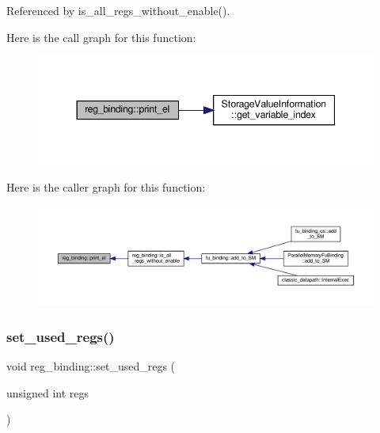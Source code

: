 Referenced by is\+\_\+all\+\_\+regs\+\_\+without\+\_\+enable().

Here is the call graph for this function\+:
\nopagebreak
\begin{figure}[H]
\begin{center}
\leavevmode
\includegraphics[width=344pt]{da/d7c/classreg__binding_abcd4e3cda44712d54c47301cc5fedfb0_cgraph}
\end{center}
\end{figure}
Here is the caller graph for this function\+:
\nopagebreak
\begin{figure}[H]
\begin{center}
\leavevmode
\includegraphics[width=350pt]{da/d7c/classreg__binding_abcd4e3cda44712d54c47301cc5fedfb0_icgraph}
\end{center}
\end{figure}
\mbox{\label{classreg__binding_a9148072d5c10c39562d8e63e17cf2ccb}} 
\subsubsection{\texorpdfstring{set\+\_\+used\+\_\+regs()}{set\_used\_regs()}}
{\footnotesize\ttfamily void reg\+\_\+binding\+::set\+\_\+used\+\_\+regs (\begin{DoxyParamCaption}\item[{unsigned int}]{regs }\end{DoxyParamCaption})\hspace{0.3cm}{\ttfamily [inline]}}




